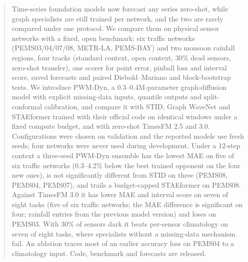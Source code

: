 \begin{abstract}
Time-series foundation models now forecast any series zero-shot, while graph specialists are still trained per
network, and the two are rarely compared under one protocol. We compare them on physical sensor networks with a fixed,
open benchmark: six traffic networks (PEMS03/04/07/08, METR-LA, PEMS-BAY) and two monsoon rainfall regions, four
tracks (standard context, open context, 30\% dead sensors, zero-shot transfer), one scorer for point error, pinball
loss and interval score, saved forecasts and paired Diebold--Mariano and block-bootstrap tests. We introduce PWM-Dyn,
a 0.3--0.4M-parameter graph-diffusion model with explicit missing-data inputs, quantile outputs and split-conformal
calibration, and compare it with STID, Graph WaveNet and STAEformer trained with their official code on identical
windows under a fixed compute budget, and with zero-shot TimesFM 2.5 and 3.0. Configurations were chosen on
validation and the reported models use fresh seeds; four networks were never used during development. Under a
12-step context a three-seed PWM-Dyn ensemble has the lowest MAE on five of six traffic networks (0.3--4.2\% below the best trained opponent
on the four new ones), is not significantly different from STID on three (PEMS08, PEMS04, PEMS07), and trails a
budget-capped STAEformer on PEMS08. Against TimesFM 3.0 it has lower MAE and interval score on seven of eight tasks
(five of six traffic networks; the MAE difference is significant on four; rainfall entries from the previous model
version) and loses
on PEMS03. With 30\% of sensors dark it beats per-sensor
climatology on seven of eight tasks, where specialists without a missing-data mechanism fail. An ablation traces most of an
earlier accuracy loss on PEMS04 to a climatology input. Code, benchmark and forecasts are released.
\end{abstract}
